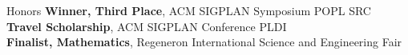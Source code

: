 
\begin{rSection}{Honors}
	\textbf{Winner, Third Place}, ACM SIGPLAN Symposium POPL SRC \hfill \color{darkgray}{2023}
	\color{black}
	\\
	\textbf{Travel Scholarship}, ACM SIGPLAN Conference PLDI \hfill \color{darkgray}{2022}
	\color{black}
	\\
	\textbf{Finalist, Mathematics}, Regeneron International Science and Engineering Fair \hfill \color{darkgray}{2020 \& 2021}
	\color{black} 

\end{rSection} 